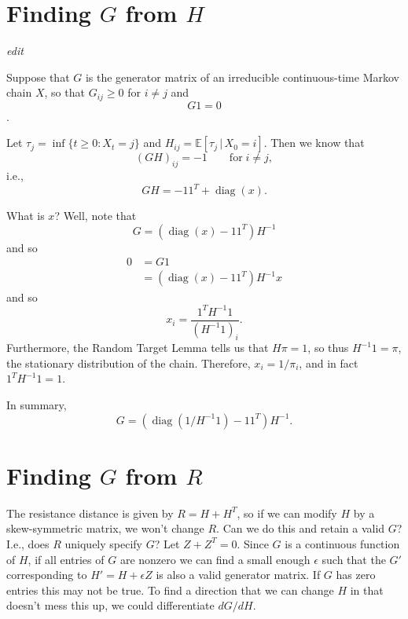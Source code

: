 \documentclass{article}
\DeclareMathOperator{\diag}{\mathop{\mbox{diag}}}
\newcommand{\E}{\mathbb{E}}
\newcommand{\plr}[1]{{\em \color{blue} #1}}
\begin{document}


\appendix


\section{Finding $G$ from $H$}
\label{apx::hitting_calcs}

\plr{edit}

Suppose that $G$ is the generator matrix of an irreducible continuous-time Markov chain $X$,
so that $G_{ij} \ge 0$ for $i \neq j$ and
$$ G 1 = 0 $$.

Let $\tau_{j} = \inf\{t \ge 0 : X_t = j\}$ and $H_{ij} = \E[\tau_j \,|\, X_0 = i]$.
Then we know that
$$
    (G H)_{ij} = -1 \qquad \text{for} \; i \neq j ,
$$
i.e.,
$$
    GH = - 1 1^T + \diag(x).
$$

What is $x$?  Well, note that
$$
    G = (\diag(x) - 1 1^T) H^{-1}
$$
and so
$$ \begin{aligned}
    0 &= G1 \\
    &= (\diag(x) - 1 1^T) H^{-1} x 
\end{aligned} $$
and so
$$
    x_i = \frac{ 1^T H^{-1} 1 }{ (H^{-1} 1)_i } .
$$
Furthermore,
the Random Target Lemma \citep{aldous} %
tells us that $H \pi = 1$, so thus $H^{-1} 1 = \pi$, the stationary distribution of the chain.
Therefore, $x_i = 1/\pi_i$,
and in fact $1^T H^{-1} 1 = 1$.

In summary,
$$
    G = (\diag(1/H^{-1} 1) - 1 1^T) H^{-1} .
$$


\section{Finding $G$ from $R$}

The resistance distance is given by
$R = H + H^T$, so if we can modify $H$ by a skew-symmetric matrix,
we won't change $R$.
Can we do this and retain a valid $G$?
I.e., does $R$ uniquely specify $G$?
Let $Z + Z^T = 0$. 
Since $G$ is a continuous function of $H$, if all entries of $G$ are nonzero
we can find a small enough $\epsilon$ such that the $G'$ corresponding to $H' = H + \epsilon Z$
is also a valid generator matrix.
If $G$ has zero entries this may not be true.
To find a direction that we can change $H$ in that doesn't mess this up,
we could differentiate $dG/dH$.
\end{document}
